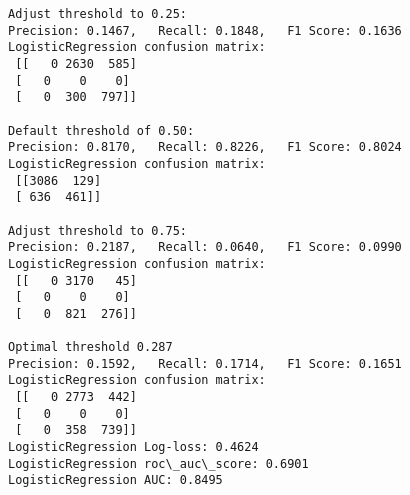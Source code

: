 \documentclass[11pt]{article}
\begin{document}
\begin{Verbatim}[commandchars=\\\{\}]
Adjust threshold to 0.25:
Precision: 0.1467,   Recall: 0.1848,   F1 Score: 0.1636
LogisticRegression confusion matrix: 
 [[   0 2630  585]
 [   0    0    0]
 [   0  300  797]]

Default threshold of 0.50:
Precision: 0.8170,   Recall: 0.8226,   F1 Score: 0.8024
LogisticRegression confusion matrix: 
 [[3086  129]
 [ 636  461]]

Adjust threshold to 0.75:
Precision: 0.2187,   Recall: 0.0640,   F1 Score: 0.0990
LogisticRegression confusion matrix: 
 [[   0 3170   45]
 [   0    0    0]
 [   0  821  276]]

Optimal threshold 0.287
Precision: 0.1592,   Recall: 0.1714,   F1 Score: 0.1651
LogisticRegression confusion matrix: 
 [[   0 2773  442]
 [   0    0    0]
 [   0  358  739]]
LogisticRegression Log-loss: 0.4624
LogisticRegression roc\_auc\_score: 0.6901
LogisticRegression AUC: 0.8495

    \end{Verbatim}

    \begin{center}
    \end{center}
    { \hspace*{\fill} \\}
    
\end{document}
